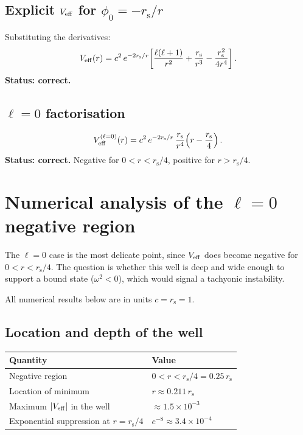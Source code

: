 \documentclass[11pt]{article}
\newcommand{\rs}{r_{\mathrm{s}}}
\begin{document}
\subsection{Explicit $V_{\rm eff}$ for $\phi_0=-\rs/r$}
Substituting the derivatives:
\begin{equation}
V_{\rm eff}(r)=c^2\,e^{-2\rs/r}\!\left[
\frac{\ell(\ell+1)}{r^2}+\frac{\rs}{r^3}-\frac{\rs^2}{4r^4}
\right].
\label{eq:Veff_explicit}
\end{equation}
\textbf{Status: \checkmark\; correct.}

\subsection{$\ell=0$ factorisation}
\begin{equation}
V_{\rm eff}^{(\ell=0)}(r)
=c^2\,e^{-2\rs/r}\,\frac{\rs}{r^4}\!\left(r-\frac{\rs}{4}\right).
\end{equation}
\textbf{Status: \checkmark\; correct.}  Negative for $0<r<\rs/4$,
positive for $r>\rs/4$.

\section{Numerical analysis of the $\ell=0$ negative region}
\label{sec:numerical}

The $\ell=0$ case is the most delicate point, since
$V_{\rm eff}$ does become negative for $0<r<\rs/4$.  The question is
whether this well is deep and wide enough to support a bound state
($\omega^2<0$), which would signal a tachyonic instability.

All numerical results below are in units $c=\rs=1$.

\subsection{Location and depth of the well}

\begin{center}
\renewcommand{\arraystretch}{1.3}
\begin{tabular}{@{}ll@{}}
\toprule
\textbf{Quantity} & \textbf{Value} \\
\midrule
Negative region & $0<r<\rs/4=0.25\,\rs$ \\
Location of minimum & $r\approx 0.211\,\rs$ \\
Maximum $|V_{\rm eff}|$ in the well & $\approx 1.5\times 10^{-3}$ \\
Exponential suppression at $r=\rs/4$ & $e^{-8}\approx 3.4\times 10^{-4}$ \\
\bottomrule
\end{tabular}
\end{center}
\end{document}
